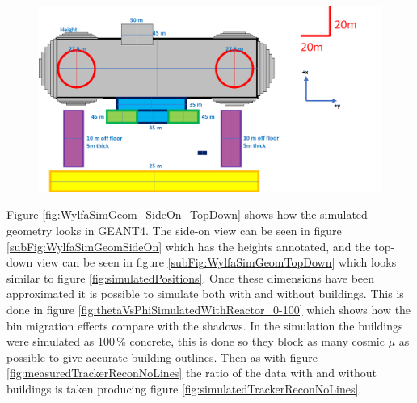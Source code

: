 \begin{figure}[htbp]
 \centering
 \includegraphics[width=\linewidth]{Chapter5/Figs/wylfaRasterNew/simulatedHeights.png}
 \label{fig:simulatedHeights}
\end{figure}

Figure \ref{fig:WylfaSimGeom_SideOn_TopDown} shows how the simulated geometry looks in  GEANT4. The side-on view can be seen in figure \ref{subFig:WylfaSimGeomSideOn} which has the heights annotated, and the top-down view can be seen in figure \ref{subFig:WylfaSimGeomTopDown} which looks similar to figure \ref{fig:simulatedPositions}. Once these dimensions have been approximated it is possible to simulate both with and without buildings. This is done in figure \ref{fig:thetaVsPhiSimulatedWithReactor_0-100} which shows how the bin migration effects compare with the shadows. In the simulation the buildings were simulated as 100\,\% concrete, this is done so they block as many cosmic $\mu$ as possible to give accurate building outlines. Then as with figure  \ref{fig:measuredTrackerReconNoLines} the ratio of the data with and without buildings is taken producing figure \ref{fig:simulatedTrackerReconNoLines}. 

